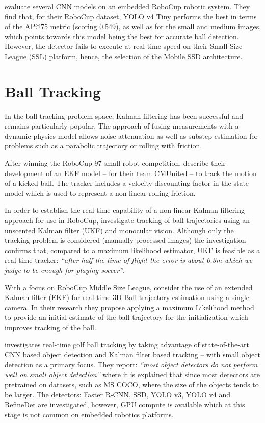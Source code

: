 \documentclass[a4paper,twoside,12pt]{report}
\begin{document}
\cite{robocupdataset} evaluate several CNN models on an embedded RoboCup robotic system. They find that, for their RoboCup dataset, YOLO v4 Tiny performs the best in terms of the AP@75 metric (scoring 0.549), as well as for the small and medium images, which points towards this model being the best for accurate ball detection. However, the detector fails to execute at real-time speed on their Small Size League (SSL) platform, hence, the selection of the Mobile SSD architecture.

\section{Ball Tracking}
\label{section:balltracking}

In the ball tracking problem space, Kalman filtering has been successful and remains particularly popular. The approach of fusing measurements with a dynamic physics model allows noise attenuation as well as substep estimation for problems such as a parabolic trajectory or rolling with friction.

After winning the RoboCup-97 small-robot competition, \cite{kalmanmodel} describe their development of an EKF model -- for their team CMUnited -- to track the motion of a kicked ball. The tracker includes a velocity discounting factor in the state model which is used to represent a non-linear rolling friction. 

In order to establish the real-time capability of a non-linear Kalman filtering approach for use in RoboCup, \cite{robocuptrack} investigate tracking of ball trajectories using an unscented Kalman filter (UKF) and monocular vision. Although only the tracking problem is considered (manually processed images) the investigation confirms that, compared to a maximum likelihood estimator, UKF is feasible as a real-time tracker: \textit{``after half the time of flight the error is about 0.3m which we judge to be enough for playing soccer''}.

With a focus on RoboCup Middle Size League, \cite{3dparabola} consider the use of an extended Kalman filter (EKF) for real-time 3D Ball trajectory estimation using a single camera. In their research they propose applying a maximum Likelihood method to provide an initial estimate of the ball trajectory for the initialization which improves tracking of the ball.

\cite{golftrack} investigates real-time golf ball tracking by taking advantage of state-of-the-art CNN based object detection and Kalman filter based tracking -- with small object detection as a primary focus. They report: \textit{``most object detectors do not perform well on small object detection''} where it is explained that since most detectors are pretrained on datasets, such as MS COCO, where the size of the objects tends to be larger. The detectors: Faster R-CNN, SSD, YOLO v3, YOLO v4 and RefineDet are investigated, however, GPU compute is available which at this stage is not common on embedded robotics platforms. 
\end{document}
